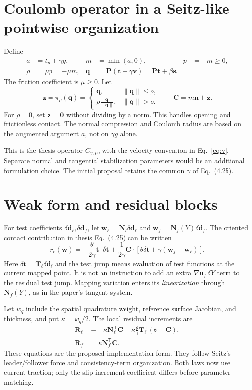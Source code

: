 \documentclass[11pt,a4paper]{article}
\newcommand{\tr}{^{\mathsf T}}
\newcommand{\vn}{\bm n}
\newcommand{\vt}{\bm t}
\newcommand{\vq}{\bm q}
\newcommand{\vs}{\bm s}
\newcommand{\vC}{\bm C}
\newcommand{\Proj}{\bm P}
\newcommand{\Nm}{\bm N}
\newcommand{\Tm}{\bm T}
\begin{document}
\section{Coulomb operator in a Seitz-like pointwise organization}
Define
\begin{align}
 a&=t_n+\gamma g,& m&=\min(a,0),& p&=-m\geq0,\\
 \rho&=\mu p=-\mu m,&
 \vq&=\Proj(\vt-\gamma\bm v)
      =\Proj\vt+\beta\vs.\label{eq:q}
\end{align}
The friction coefficient is $\mu\geq0$. Let
\begin{equation}\label{eq:projection}
 \bm z=\pi_\rho(\vq)=
 \begin{cases}
   \vq,&\|\vq\|\leq\rho,\\
   \displaystyle\rho\frac{\vq}{\|\vq\|},&\|\vq\|>\rho.
 \end{cases}
 \qquad
 \vC=m\vn+\bm z.
\end{equation}
For $\rho=0$, set $\bm z=\bm0$ without dividing by a norm. This handles
opening and frictionless contact. The normal compression and Coulomb radius
are based on the augmented argument $a$, not on $\gamma g$ alone.

This is the thesis operator $C_{\gamma,\mu}$, with the velocity convention in
Eq.~\eqref{eq:v}. Separate normal and tangential stabilization parameters would
be an additional formulation choice. The initial proposal retains the common
$\gamma$ of Eq.~(4.25).

\section{Weak form and residual blocks}
For test coefficients $\delta\bm d_\ell,\delta\bm d_f$, let
$\bm w_\ell=\Nm_\ell\delta\bm d_\ell$ and
$\bm w_f=\Nm_f(Y)\delta\bm d_f$. The oriented contact contribution in
thesis Eq.~(4.25) can be written
\begin{equation}\label{eq:weak}
 r_c(\bm w)=
 -\frac{\theta}{2\gamma}\vt\cdot\delta\vt
 +\frac{1}{2\gamma}\vC\cdot
      \left[\theta\delta\vt+\gamma(\bm w_f-\bm w_\ell)\right].
\end{equation}
Here $\delta\vt=\Tm_\ell\delta\bm d_\ell$ and the test jump means evaluation
of test functions at the current mapped point. It is not an instruction to add
an extra $\nabla\bm u_f\,\delta Y$ term to the residual test jump. Mapping
variation enters its \emph{linearization} through $\Nm_f(Y)$, as in the paper's
tangent system.

Let $w_q$ include the spatial quadrature weight, reference surface Jacobian,
and thickness, and put $\kappa=w_q/2$. The local residual increments are
\begin{align}
 \bm R_\ell&=-\kappa\Nm_\ell\tr\vC
 -\kappa\frac{\theta}{\gamma}\Tm_\ell\tr(\vt-\vC),\label{eq:Rl}\\
 \bm R_f&=\kappa\Nm_f\tr\vC.\label{eq:Rf}
\end{align}
These equations are the proposed implementation form. They follow Seitz's
leader/follower force and consistency-term organization. Both laws now use
current traction; only the slip-increment coefficient differs before parameter
matching.
\end{document}

